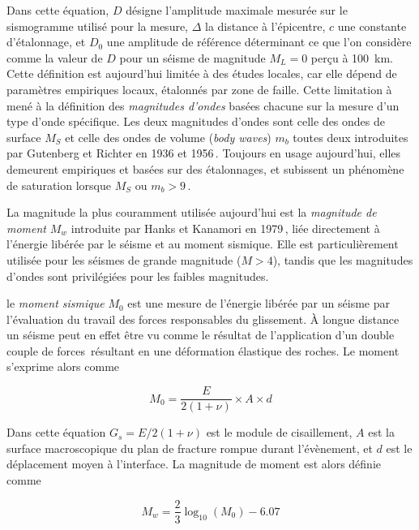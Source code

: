 Dans cette équation, $D$ désigne l'amplitude maximale mesurée sur le sismogramme utilisé pour la mesure, $\Delta$ la distance à l'épicentre, $c$ une constante d'étalonnage, et $D_0$ une amplitude de référence déterminant ce que l'on considère comme la valeur de $D$ pour un séisme de magnitude $M_L=0$ perçu à \SI{100}{\kilo\meter}. Cette définition est aujourd'hui limitée à des études locales, car elle dépend de paramètres empiriques locaux, étalonnés par zone de faille. Cette limitation à mené à la définition des \textit{magnitudes d'ondes} basées chacune sur la mesure d'un type d'onde spécifique. Les deux magnitudes d'ondes sont celle des ondes de surface $M_S$ et celle des ondes de volume (\textit{body waves}) $m_b$ toutes deux introduites par Gutenberg et Richter en 1936 et 1956\,\cite{gutenberg_magnitude_1936,gutenberg_earthquake_1956}. Toujours en usage aujourd'hui, elles demeurent empiriques et basées sur des étalonnages, et subissent un phénomène de saturation lorsque $M_S$ ou $m_b>9$\,\cite{kanamori_energy_1977, howell_saturation_1981}.

La magnitude la plus couramment utilisée aujourd'hui est la \textit{magnitude de moment} $M_w$ introduite par Hanks et Kanamori en 1979\,\cite{hanks_moment_1979}, liée directement à l'énergie libérée par le séisme et au moment sismique. Elle est particulièrement utilisée pour les séismes de grande magnitude ($M>4$), tandis que les magnitudes d'ondes sont privilégiées pour les faibles magnitudes.


le \textit{moment sismique} $M_0$ est une mesure de l'énergie libérée par un séisme par l'évaluation du travail des forces responsables du glissement. À longue distance un séisme peut en effet être vu comme le résultat de l'application d'un double couple de forces\,\cite{kagan_3-D_1991} résultant en une déformation élastique des roches. Le moment s'exprime alors comme

\begin{equation}
M_0=\frac{E}{2(1+\nu)}\times A\times d
\end{equation}

Dans cette équation $G_s=E/2(1+\nu)$ est le module de cisaillement, $A$ est la surface macroscopique du plan de fracture rompue durant l'évènement, et $d$ est le déplacement moyen à l'interface. La magnitude de moment est alors définie comme

\begin{equation}
M_w=\frac{2}{3}\log_{10}(M_0)-6.07
\label{eq:magnitude}
\end{equation}

